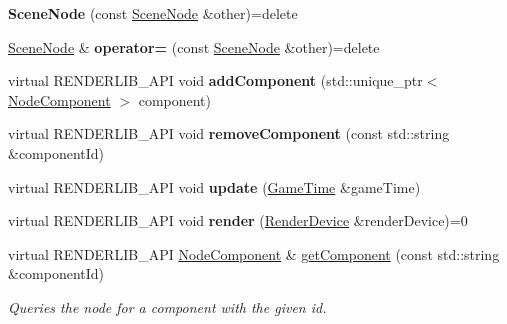 \begin{DoxyCompactItemize}
\item 
\mbox{\label{class_scene_node_ae4436f7c7d6ea817cfdce7e539f99e13}} 
{\bfseries Scene\+Node} (const \hyperlink{class_scene_node}{Scene\+Node} \&other)=delete
\item 
\mbox{\label{class_scene_node_a726714ab2af70380202fe64bb4532e04}} 
\hyperlink{class_scene_node}{Scene\+Node} \& {\bfseries operator=} (const \hyperlink{class_scene_node}{Scene\+Node} \&other)=delete
\item 
\mbox{\label{class_scene_node_afed43bacb24221017fa6bb237bf1def1}} 
virtual R\+E\+N\+D\+E\+R\+L\+I\+B\+\_\+\+A\+PI void {\bfseries add\+Component} (std\+::unique\+\_\+ptr$<$ \hyperlink{class_node_component}{Node\+Component} $>$ component)
\item 
\mbox{\label{class_scene_node_a501c1c791e70537487de1354cbf313d7}} 
virtual R\+E\+N\+D\+E\+R\+L\+I\+B\+\_\+\+A\+PI void {\bfseries remove\+Component} (const std\+::string \&component\+Id)
\item 
\mbox{\label{class_scene_node_a78106bd0e7daa1871dc0fb26a98c09a6}} 
virtual R\+E\+N\+D\+E\+R\+L\+I\+B\+\_\+\+A\+PI void {\bfseries update} (\hyperlink{class_game_time}{Game\+Time} \&game\+Time)
\item 
\mbox{\label{class_scene_node_a25e06dbc543062880a82246e525a9725}} 
virtual R\+E\+N\+D\+E\+R\+L\+I\+B\+\_\+\+A\+PI void {\bfseries render} (\hyperlink{class_render_device}{Render\+Device} \&render\+Device)=0
\item 
\mbox{\label{class_scene_node_a4a0b83e00a3edd492423970b44eb68cc}} 
virtual R\+E\+N\+D\+E\+R\+L\+I\+B\+\_\+\+A\+PI \hyperlink{class_node_component}{Node\+Component} \& \hyperlink{class_scene_node_a4a0b83e00a3edd492423970b44eb68cc}{get\+Component} (const std\+::string \&component\+Id)
\begin{DoxyCompactList}\small\item\em Queries the node for a component with the given id. \end{DoxyCompactList}\end{DoxyCompactItemize}


